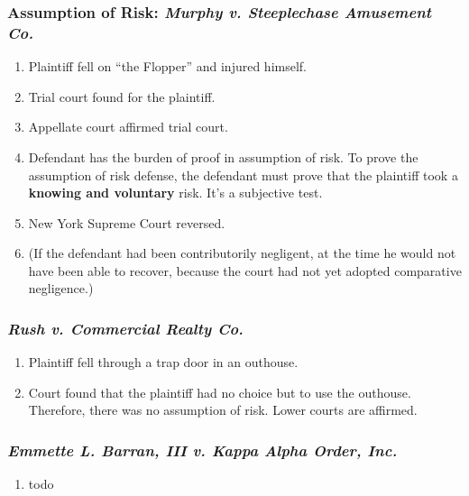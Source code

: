 \subsubsection{Assumption of Risk: \emph{Murphy v. Steeplechase Amusement Co.}}

\begin{enumerate}
    \item Plaintiff fell on ``the Flopper'' and injured himself.
    \item Trial court found for the plaintiff.
    \item Appellate court affirmed trial court.
    \item Defendant has the burden of proof in assumption of risk. To prove the assumption of risk defense, the defendant must prove that the plaintiff took a \textbf{knowing and voluntary} risk. It's a subjective test.
    \item New York Supreme Court reversed. 
    \item (If the defendant had been contributorily negligent, at the time he would not have been able to recover, because the court had not yet adopted comparative negligence.)
\end{enumerate}

\subsubsection{\emph{Rush v. Commercial Realty Co.}}

\begin{enumerate}
    \item Plaintiff fell through a trap door in an outhouse.
    \item Court found that the plaintiff had no choice but to use the outhouse. Therefore, there was no assumption of risk. Lower courts are affirmed.
\end{enumerate}

\subsubsection{\emph{Emmette L. Barran, III v. Kappa Alpha Order, Inc.}}

\begin{enumerate}
    \item todo
\end{enumerate}

